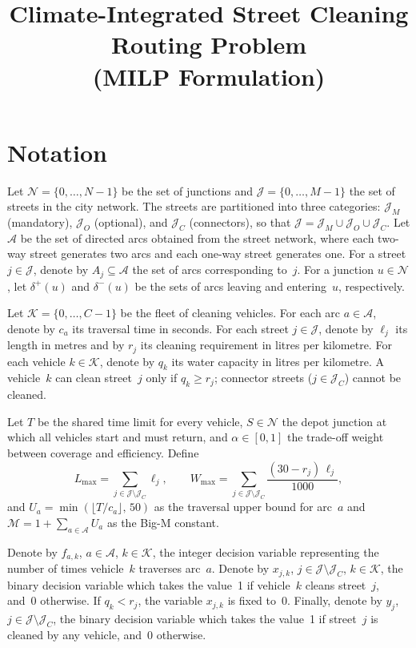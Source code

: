 \documentclass[11pt]{article}
\title{Climate-Integrated Street Cleaning Routing Problem\\(MILP Formulation)}
\author{}
\date{}
\begin{document}
\maketitle

\section{Notation}

Let $\mathcal{N} = \{0, \dots, N-1\}$ be the set of junctions and
$\mathcal{J} = \{0, \dots, M-1\}$ the set of streets in the city network.
The streets are partitioned into three categories:
$\mathcal{J}_M$ (mandatory),
$\mathcal{J}_O$ (optional), and
$\mathcal{J}_C$ (connectors), so that
$\mathcal{J} = \mathcal{J}_M \cup \mathcal{J}_O \cup \mathcal{J}_C$.
Let $\mathcal{A}$ be the set of directed arcs obtained from the street
network, where each two-way street generates two arcs and each one-way
street generates one.  For a street $j \in \mathcal{J}$, denote by
$A_j \subseteq \mathcal{A}$ the set of arcs corresponding to~$j$.  For a
junction $u \in \mathcal{N}$, let $\delta^+(u)$ and $\delta^-(u)$ be the
sets of arcs leaving and entering~$u$, respectively.

Let $\mathcal{K} = \{0, \dots, C-1\}$ be the fleet of cleaning vehicles.
For each arc $a \in \mathcal{A}$, denote by $c_a$ its traversal time in
seconds.  For each street $j \in \mathcal{J}$, denote by $\ell_j$ its
length in metres and by $r_j$ its cleaning requirement in litres per
kilometre.  For each vehicle $k \in \mathcal{K}$, denote by $q_k$ its water
capacity in litres per kilometre.  A vehicle~$k$ can clean street~$j$ only
if $q_k \ge r_j$; connector streets ($j \in \mathcal{J}_C$) cannot be
cleaned.

Let $T$ be the shared time limit for every vehicle, $S \in \mathcal{N}$ the
depot junction at which all vehicles start and must return, and
$\alpha \in [0,1]$ the trade-off weight between coverage and efficiency.
Define
\[
L_{\max}=\sum_{j\in \mathcal{J}\setminus\mathcal{J}_C}\ell_j,
\qquad
W_{\max}=\sum_{j\in \mathcal{J}\setminus\mathcal{J}_C}\frac{(30-r_j)\,\ell_j}{1000},
\]
and $U_a = \min(\lfloor T / c_a
\rfloor,\, 50)$ as the traversal upper bound for arc~$a$ and $\mathcal{M}
= 1 + \sum_{a \in \mathcal{A}} U_a$ as the Big-M constant.

Denote by $f_{a,k}$, $a \in \mathcal{A}$, $k \in \mathcal{K}$, the
integer decision variable representing the number of times vehicle~$k$
traverses arc~$a$.  Denote by $x_{j,k}$, $j \in \mathcal{J} \setminus
\mathcal{J}_C$, $k \in \mathcal{K}$, the binary decision variable which
takes the value~1 if vehicle~$k$ cleans street~$j$, and~0 otherwise.  If
$q_k < r_j$, the variable $x_{j,k}$ is fixed to~0.  Finally, denote by
$y_j$, $j \in \mathcal{J} \setminus \mathcal{J}_C$, the binary decision
variable which takes the value~1 if street~$j$ is cleaned by any vehicle,
and~0 otherwise.
\end{document}
